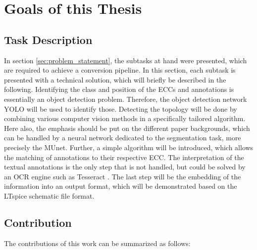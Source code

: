 \section{Goals of this Thesis}

\subsection{Task Description}

In section \ref{sec:problem_statement}, the subtasks at hand were presented, which are required to achieve a conversion pipeline.
In this section, each subtask is presented with a technical solution, which will briefly be described in the following.
Identifying the class and position of the \acp{ECC} and annotations is essentially an object detection problem.
Therefore, the object detection network \ac{YOLO} will be used to identify those.
Detecting the topology will be done by combining various computer vision methods in a specifically tailored algorithm.
Here also, the emphasis should be put on the different paper backgrounds, which can be handled by a neural network dedicated to the segmentation task, more precisely the \ac{MUnet}.
Further, a simple algorithm will be introduced, which allows the matching of annotations to their respective \ac{ECC}.
The interpretation of the textual annotations is the only step that is not handled, but could be solved by an \ac{OCR} engine such as Tesseract \cite{tesseract}.
The last step will be the embedding of the information into an output format, which will be demonstrated based on the LTspice schematic file format.

\subsection{Contribution}

The contributions of this work can be summarized as follows:

